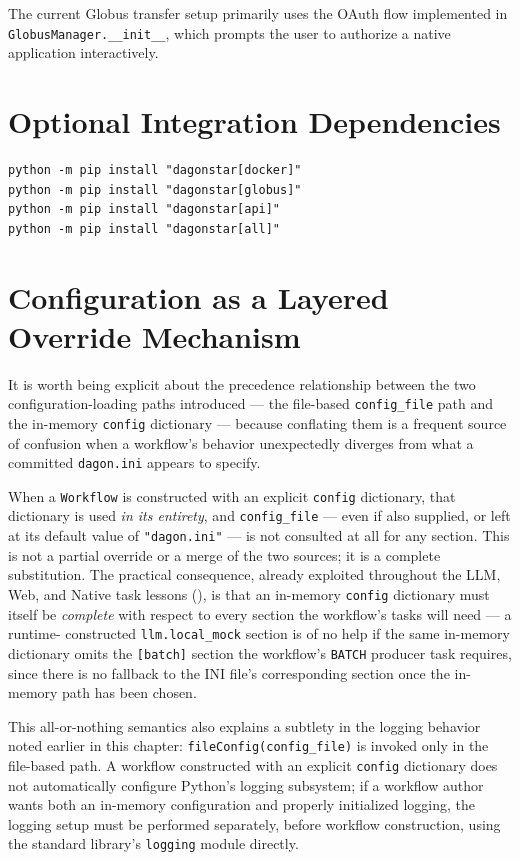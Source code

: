 The current Globus transfer setup primarily uses the OAuth flow implemented
in \texttt{GlobusManager.\_\_init\_\_}, which prompts the user to authorize a
native application interactively.

\section{Optional Integration Dependencies}

\begin{lstlisting}[style=bash]
python -m pip install "dagonstar[docker]"
python -m pip install "dagonstar[globus]"
python -m pip install "dagonstar[api]"
python -m pip install "dagonstar[all]"
\end{lstlisting}

\section{Configuration as a Layered Override Mechanism}

It is worth being explicit about the precedence relationship between the two
configuration-loading paths  introduced --- the
file-based \texttt{config\_file} path and the in-memory \texttt{config}
dictionary --- because conflating them is a frequent source of confusion
when a workflow's behavior unexpectedly diverges from what a committed
\texttt{dagon.ini} appears to specify.

When a \texttt{Workflow} is constructed with an explicit \texttt{config}
dictionary, that dictionary is used \emph{in its entirety}, and
\texttt{config\_file} --- even if also supplied, or left at its default
value of \texttt{"dagon.ini"} --- is not consulted at all for any section.
This is not a partial override or a merge of the two sources; it is a
complete substitution. The practical consequence, already exploited
throughout the LLM, Web, and Native task lessons (),
is that an in-memory \texttt{config} dictionary must itself be \emph{complete}
with respect to every section the workflow's tasks will need --- a runtime-
constructed \texttt{llm.local\_mock} section is of no help if the same
in-memory dictionary omits the \texttt{[batch]} section the workflow's
\texttt{BATCH} producer task requires, since there is no fallback to the
INI file's corresponding section once the in-memory path has been chosen.

\begin{cautionbox}
This all-or-nothing semantics also explains a subtlety in the logging
behavior noted earlier in this chapter: \texttt{fileConfig(config\_file)} is
invoked only in the file-based path. A workflow constructed with an explicit
\texttt{config} dictionary does not automatically configure Python's
logging subsystem; if a workflow author wants both an in-memory
configuration and properly initialized logging, the logging setup must be
performed separately, before workflow construction, using the standard
library's \texttt{logging} module directly.
\end{cautionbox}

